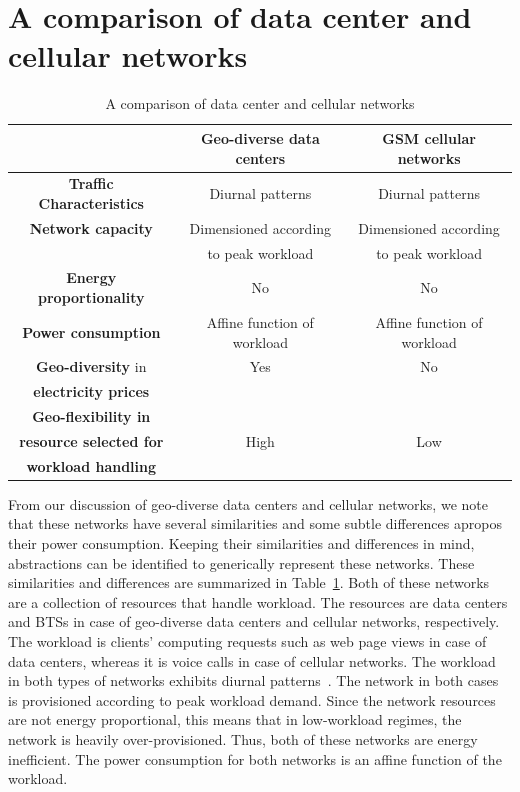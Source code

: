 \section{A comparison of data center and cellular networks} %
\label{sec:chap2:comparison}
\begin{table}
\begin{center}
\begin{tabular}{|c|c|c|}
\hline \ & \textbf{Geo-diverse data centers} & \textbf{GSM cellular networks} \\
\hline \textbf{Traffic Characteristics} & Diurnal patterns & Diurnal patterns \\
\hline \textbf{Network capacity} & Dimensioned according & Dimensioned according \\
\ & to peak workload & to peak workload \\
\hline \textbf{Energy proportionality} & No & No \\
\hline \textbf{Power consumption} & Affine function of workload & Affine function of workload \\
\hline \textbf{Geo-diversity} in & Yes & No \\
\textbf{electricity prices} & \ & \ \\
\hline \textbf{Geo-flexibility in} & \ & \ \\
\textbf{resource selected for} & High & Low \\
\textbf{workload handling} & \ & \ \\
\hline
\end{tabular}
\caption{A comparison of data center and cellular networks}
\label{tab:contrast}
\end{center}
\end{table}

From our discussion of geo-diverse data centers and cellular networks, we note that these networks have several similarities and some subtle differences apropos their power consumption. Keeping their similarities and differences in mind, abstractions can be identified to generically represent these networks. These similarities and differences are summarized in Table~\ref{tab:contrast}. Both of these networks are a collection of resources that handle workload. The resources are data centers and BTSs in case of geo-diverse data centers and cellular networks, respectively. The workload is clients' computing requests such as web page views in case of data centers, whereas it is voice calls in case of cellular networks. The workload in both types of networks exhibits diurnal patterns~\cite{10.1109/MC.2007.443,Peng:2011:TPS:2030613.2030628}. The network in both cases is provisioned according to peak workload demand. Since the network resources are not energy proportional, this means that in low-workload regimes, the network is heavily over-provisioned. Thus, both of these networks are energy inefficient. The power consumption for both networks is an affine function of the workload. 

